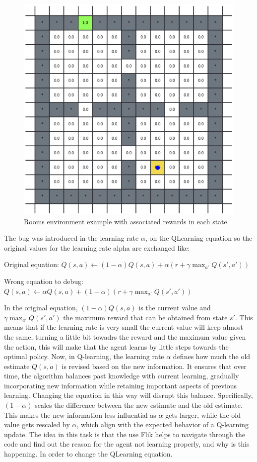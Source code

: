 \begin{figure}[h]
  \centering
  \includegraphics[width=0.5\columnwidth]{figures/rooms.png}
  \caption{Rooms environment example with associated rewards in each state}
  \label{fig:rooms}
\end{figure}

The bug was introduced in the learning rate $\alpha$, on the QLearning equation 
so the original values for the learning rate alpha are exchanged like:

Original equation:
$
Q(s, a) \leftarrow (1-\alpha) Q(s, a) + \alpha \left( r + \gamma \max_{a'} Q(s', a') \right)
$

Wrong equation to debug:
$
Q(s, a) \leftarrow  \alpha Q(s, a) + (1-\alpha) \left( r + \gamma \max_{a'} Q(s', a') \right)
$

In the original equation,  $(1-\alpha) Q(s, a)$ is the current value and $\gamma \max_{a'} Q(s', a')$ 
the maximum reward that can be obtained from state $s'$. This means that if the learning rate is very 
small the current value will keep almost the same, turning a little bit towadrs the reward and the 
maximum value given the action, this will make that the agent learns by little steps towards the 
optimal policy. Now, in Q-learning, the learning rate $\alpha$ defines how much the old estimate $Q(s,a)$ 
is revised based on the new information. It ensures that over time, the algorithm balances past 
knowledge with current learning, gradually incorporating new information while retaining important 
aspects of previous learning. Changing the equation in this way will disrupt this balance. Specifically,
$(1-\alpha)$ scales the difference between the new estimate and the old estimate. This makes the new 
information less influential as $\alpha$ gets larger, while the old value gets rescaled by $\alpha$, 
which align with the expected behavior of a Q-learning update. The idea in this task is that 
the use Flik helps to navigate through the code and find out the reason for the agent not 
learning properly, and why is this happening. In order to change the QLearning equation.

